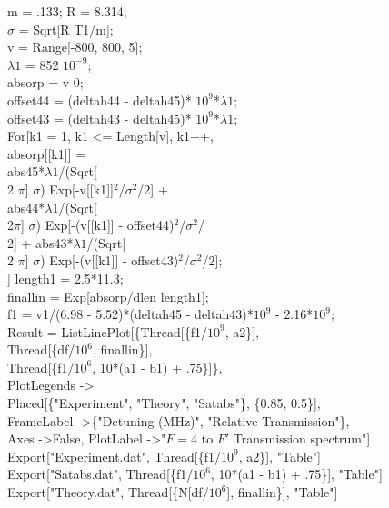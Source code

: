 {m = .133; R = 8.314;\\
$\sigma$ = Sqrt[R T1/m];\\
v = Range[-800, 800, 5];\\
$\lambda 1$ = 852 $10^{-9}$;\\
absorp = v 0;\\
offset44 = (deltah44 - deltah45)* $10^{9}$*$\lambda 1$;\\
offset43 = (deltah43 - deltah45)* $10^{9}$*$\lambda 1$;\\
For[k1 = 1, k1 \textless= Length[v], k1++,\\
 absorp[[k1]] = \\
   abs45*$\lambda 1$/(Sqrt[\\
         2 $\pi$] $\sigma$) Exp[-v[[k1]]$^2$/$\sigma^2$/2] + \\
    abs44*$\lambda 1$/(Sqrt[\\
         2$\pi$] $\sigma$) Exp[-(v[[k1]] - offset44)$^2$/$\sigma^2$/ \\
       2] + abs43*$\lambda 1$/(Sqrt[\\
         2 $\pi$] $\sigma$) Exp[-(v[[k1]] - offset43)$^2$/$\sigma^2$/2];\\
 ]
length1 = 2.5*11.3; \\
finallin = Exp[absorp/dlen length1];\\
f1 = v1/(6.98 - 5.52)*(deltah45 - deltah43)*$10^{9}$ - 2.16*$10^{9}$;\\
Result = ListLinePlot[\{Thread[\{f1/$10^{9}$, a2\}], \\
   Thread[\{df/$10^{6}$, finallin\}], \\
   Thread[\{f1/$10^{6}$, 10*(a1 - b1) + .75\}]\}, \\
  PlotLegends -\textgreater \\
   Placed[\{"Experiment", "Theory", "Satabs"\}, \{0.85, 0.5\}], \\
  FrameLabel -\textgreater \{"Detuning (MHz)", "Relative Transmission"\}, \\
  Axes -\textgreater False, PlotLabel -\textgreater "$F=4$ to $F'$ Transmission spectrum"]\\

Export["Experiment.dat", Thread[\{f1/$10^{9}$, a2\}], "Table"]\\
Export["Satabs.dat", Thread[\{f1/$10^{6}$, 10*(a1 - b1) + .75\}], "Table"]\\
Export["Theory.dat", Thread[\{N[df/$10^{6}$], finallin\}], "Table"]\\



}
